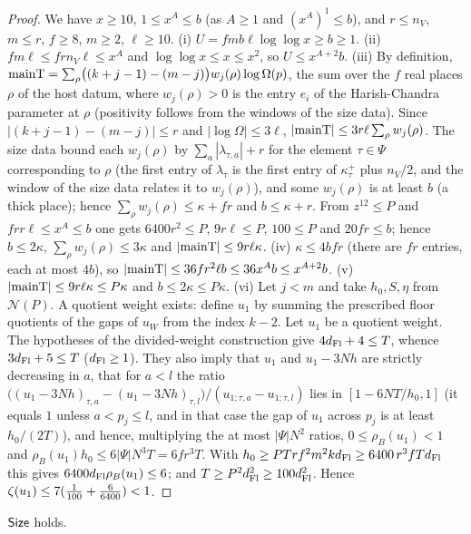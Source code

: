 \begin{proof}
We have $x\ge10$, $1\le x^A\le b$ (as $A\ge1$ and $(x^A)^1\le b$), and $r\le n_V$, $m\le r$, $f\ge8$, $m\ge2$,
$\ell\ge10$. (i) $U=fmb\ell\log\log x\ge b\ge1$. (ii) $fm\ell\le frn_V\ell\le x^A$ and $\log\log x\le x\le x^2$, so
$U\le x^{A+2}b$. (iii) By definition, $\mathrm{mainT}=\sum_\rho\bigl((k+j-1)-(m-j)\bigr)w_j(\rho)\log\Omega(p)$, the sum
over the $f$ real places $\rho$ of the host datum, where $w_j(\rho)>0$ is the entry $e_i$ of the Harish-Chandra
parameter at $\rho$ (positivity follows from the windows of the size data). Since $|(k+j-1)-(m-j)|\le r$ and
$|\log\Omega|\le3\ell$, $|\mathrm{mainT}|\le3r\ell\sum_\rho w_j(\rho)$. The size data bound each $w_j(\rho)$ by
$\sum_a|\lambda_{\tau,a}|+r$ for the element $\tau\in\Psi$ corresponding to $\rho$ (the first entry of $\lambda_\tau$ is
the first entry of $\kappa^+_\tau$ plus $n_V/2$, and the window of the size data relates it to $w_j(\rho)$), and
some $w_j(\rho)$ is at least $b$ (a thick place); hence $\sum_\rho w_j(\rho)\le\kappa+fr$ and $b\le\kappa+r$. From
$z^{12}\le P$ and $frr\ell\le x^A\le b$ one gets $6400r^2\le P$, $9r\ell\le P$, $100\le P$ and $20fr\le b$; hence
$b\le2\kappa$, $\sum_\rho w_j(\rho)\le3\kappa$ and $|\mathrm{mainT}|\le9r\ell\kappa$. (iv) $\kappa\le4bfr$ (there are
$fr$ entries, each at most $4b$), so $|\mathrm{mainT}|\le36fr^2\ell b\le36x^Ab\le x^{A+2}b$. (v) $|\mathrm{mainT}|\le
9r\ell\kappa\le P\kappa$ and $b\le2\kappa\le P\kappa$. (vi) Let $j<m$ and take $h_0,S,\eta$ from $\mathcal N(P)$. A
quotient weight exists: define $u_1$ by summing the prescribed floor quotients of the gaps of $u_W$ from the index
$k-2$. Let $u_1$ be a quotient weight. The hypotheses of the divided-weight construction give $4d_{\mathrm{Fl}}+4\le T$,
whence $3d_{\mathrm{Fl}}+5\le T$ ($d_{\mathrm{Fl}}\ge1$). They also imply that $u_1$ and $u_1-3Nh$ are strictly decreasing in
$a$, that for $a<l$ the ratio
$\bigl((u_1-3Nh)_{\tau,a}-(u_1-3Nh)_{\tau,l}\bigr)/(u_{1;\tau,a}-u_{1;\tau,l})$ lies in $[1-6NT/h_0,1]$ (it equals $1$
unless $a<p_j\le l$, and in that case the gap of $u_1$ across $p_j$ is at least $h_0/(2T)$), and hence, multiplying
the at most $|\Psi|N^2$ ratios, $0\le\rho_B(u_1)<1$ and $\rho_B(u_1)h_0\le6|\Psi|N^3T=6fr^3T$. With
$h_0\ge PTrf^2m^2kd_{\mathrm{Fl}}\ge6400\,r^3fTd_{\mathrm{Fl}}$ this gives $6400d_{\mathrm{Fl}}\rho_B(u_1)\le6$; and
$T\ge P^2d_{\mathrm{Fl}}^2\ge100d_{\mathrm{Fl}}^2$. Hence $\zeta(u_1)\le7(\frac1{100}+\frac6{6400})<1$.
\end{proof}

\begin{proposition}\label{pf:lift2:size}
$\mathsf{Size}$ holds.
\end{proposition}

